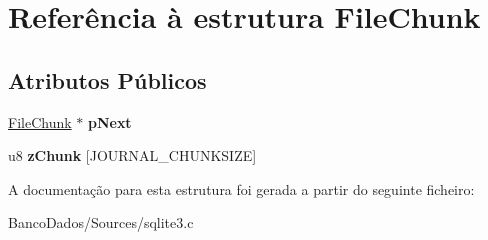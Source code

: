 \hypertarget{struct_file_chunk}{\section{Referência à estrutura File\-Chunk}
\label{struct_file_chunk}
}
\subsection*{Atributos Públicos}
\begin{DoxyCompactItemize}
\item 
\hypertarget{struct_file_chunk_ad2d0d170afc7ce1e239e8716852e247b}{\hyperlink{struct_file_chunk}{File\-Chunk} $\ast$ {\bfseries p\-Next}}\label{struct_file_chunk_ad2d0d170afc7ce1e239e8716852e247b}

\item 
\hypertarget{struct_file_chunk_ada06a9958ee6b82a6c2b15c29f847d19}{u8 {\bfseries z\-Chunk} \mbox{[}J\-O\-U\-R\-N\-A\-L\-\_\-\-C\-H\-U\-N\-K\-S\-I\-Z\-E\mbox{]}}\label{struct_file_chunk_ada06a9958ee6b82a6c2b15c29f847d19}

\end{DoxyCompactItemize}


A documentação para esta estrutura foi gerada a partir do seguinte ficheiro\-:\begin{DoxyCompactItemize}
\item 
Banco\-Dados/\-Sources/sqlite3.\-c\end{DoxyCompactItemize}
